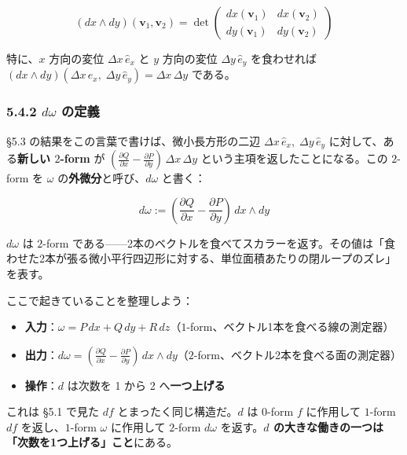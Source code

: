 \documentclass[a4paper,12pt,openany]{book}
\begin{document}
\[(dx \wedge dy)(\mathbf{v}_1, \mathbf{v}_2) = \det\begin{pmatrix} dx(\mathbf{v}_1) & dx(\mathbf{v}_2) \\ dy(\mathbf{v}_1) & dy(\mathbf{v}_2) \end{pmatrix}\]

特に、\(x\) 方向の変位 \(\Delta x\,\hat{e}_x\) と \(y\) 方向の変位
\(\Delta y\,\hat{e}_y\) を食わせれば
\((dx \wedge dy)(\Delta x\,\hat{e}_x,\; \Delta y\,\hat{e}_y) = \Delta x\,\Delta y\)
である。

\hypertarget{domega-ux306eux5b9aux7fa9}{%
\subsubsection{\texorpdfstring{5.4.2 \(d\omega\)
の定義}{5.4.2 d\textbackslash omega の定義}}\label{domega-ux306eux5b9aux7fa9}}

§5.3 の結果をこの言葉で書けば、微小長方形の二辺
\(\Delta x\,\hat{e}_x,\; \Delta y\,\hat{e}_y\)
に対して、ある\textbf{新しい $2$-form} が
\((\frac{\partial Q}{\partial x} - \frac{\partial P}{\partial y})\,\Delta x\,\Delta y\)
という主項を返したことになる。この \(2\)-form を \(\omega\)
の\textbf{外微分}と呼び、\(d\omega\) と書く：

\[d\omega := (\frac{\partial Q}{\partial x} - \frac{\partial P}{\partial y})\,dx \wedge dy\]

\(d\omega\) は \(2\)-form
である——2本のベクトルを食べてスカラーを返す。その値は「食わせた2本が張る微小平行四辺形に対する、単位面積あたりの閉ループのズレ」を表す。

ここで起きていることを整理しよう：

\begin{itemize}
\item
  \textbf{入力}：\(\omega = P\,dx + Q\,dy + R\,dz\)（\(1\)-form、ベクトル1本を食べる線の測定器）
\item
  \textbf{出力}：\(d\omega = (\frac{\partial Q}{\partial x} - \frac{\partial P}{\partial y})\,dx \wedge dy\)（\(2\)-form、ベクトル2本を食べる面の測定器）
\item
  \textbf{操作}：\(d\) は次数を 1 から 2 へ\textbf{一つ上げる}
\end{itemize}

これは §5.1 で見た \(df\) とまったく同じ構造だ。\(d\) は \(0\)-form
\(f\) に作用して \(1\)-form \(df\) を返し、\(1\)-form \(\omega\)
に作用して \(2\)-form \(d\omega\)
を返す。\textbf{$d$ の大きな働きの一つは「次数を1つ上げる」こと}にある。
\end{document}
